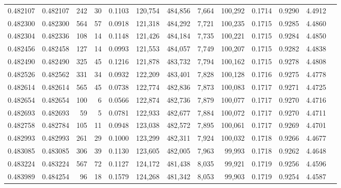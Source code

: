 \begin{tabular}{rrrrrrrrrrrrr}
0.482107 & 0.482107 &   242 &    30 &                                     0.1103 & 120,754 & 484,856 &   7,664 & 100,292 & 0.1714 & 0.9290 & 4.4912 \\
0.482300 & 0.482300 &   564 &    57 &                                     0.0918 & 121,318 & 484,292 &   7,721 & 100,235 & 0.1715 & 0.9285 & 4.4860 \\
0.482304 & 0.482336 &   108 &    14 &                                     0.1148 & 121,426 & 484,184 &   7,735 & 100,221 & 0.1715 & 0.9284 & 4.4850 \\
0.482456 & 0.482458 &   127 &    14 &                                     0.0993 & 121,553 & 484,057 &   7,749 & 100,207 & 0.1715 & 0.9282 & 4.4838 \\
0.482490 & 0.482490 &   325 &    45 &                                     0.1216 & 121,878 & 483,732 &   7,794 & 100,162 & 0.1715 & 0.9278 & 4.4808 \\
0.482526 & 0.482562 &   331 &    34 &                                     0.0932 & 122,209 & 483,401 &   7,828 & 100,128 & 0.1716 & 0.9275 & 4.4778 \\
0.482614 & 0.482614 &   565 &    45 &                                     0.0738 & 122,774 & 482,836 &   7,873 & 100,083 & 0.1717 & 0.9271 & 4.4725 \\
0.482654 & 0.482654 &   100 &     6 &                                     0.0566 & 122,874 & 482,736 &   7,879 & 100,077 & 0.1717 & 0.9270 & 4.4716 \\
0.482693 & 0.482693 &    59 &     5 &                                     0.0781 & 122,933 & 482,677 &   7,884 & 100,072 & 0.1717 & 0.9270 & 4.4711 \\
0.482758 & 0.482784 &   105 &    11 &                                     0.0948 & 123,038 & 482,572 &   7,895 & 100,061 & 0.1717 & 0.9269 & 4.4701 \\
0.482993 & 0.482993 &   261 &    29 &                                     0.1000 & 123,299 & 482,311 &   7,924 & 100,032 & 0.1718 & 0.9266 & 4.4677 \\
0.483085 & 0.483085 &   306 &    39 &                                     0.1130 & 123,605 & 482,005 &   7,963 &  99,993 & 0.1718 & 0.9262 & 4.4648 \\
0.483224 & 0.483224 &   567 &    72 &                                     0.1127 & 124,172 & 481,438 &   8,035 &  99,921 & 0.1719 & 0.9256 & 4.4596 \\
0.483989 & 0.484254 &    96 &    18 &                                     0.1579 & 124,268 & 481,342 &   8,053 &  99,903 & 0.1719 & 0.9254 & 4.4587 \\

\end{tabular}
